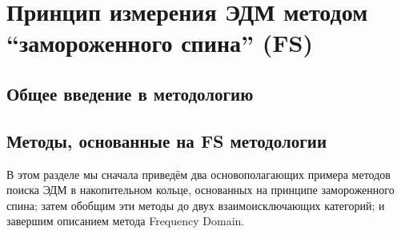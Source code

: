\chapter{Принцип измерения ЭДМ методом ``замороженного спина'' (FS)}\label{chpt1:top-level}

\section{Общее введение в методологию}\label{chpt1:FS-introduction}


\section{Методы, основанные на FS методологии}\label{chpt1:FS-methods}
В этом разделе мы сначала приведём два основополагающих примера методов поиска ЭДМ
в накопительном кольце, основанных на принципе замороженного спина;
затем обобщим  эти методы до двух взаимоисключающих категорий;
и завершим описанием метода Frequency Domain.


